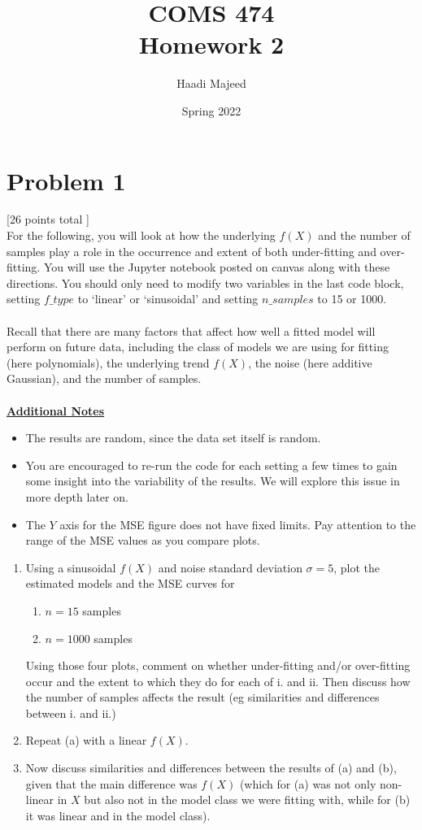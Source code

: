 \documentclass[12pt]{article}
\title{ COMS 474\\Homework 2 }
\author{ Haadi Majeed }
\date{Spring 2022}
\begin{document}
\maketitle
\pagebreak

\section*{Problem 1}
 [26 points total ]\\
For the following, you will look at how the underlying $f(X)$ and the number of samples play a role in the occurrence and extent of both under-fitting and over-fitting. You will use the Jupyter notebook posted on canvas along with these directions. You should only need to modify two variables in the last code block, setting $f\_type$ to ‘linear’ or ‘sinusoidal’ and setting $n\_samples$ to 15 or 1000.
\\\\
Recall that there are many factors that affect how well a fitted model will perform on future data, including the class of models we are using for fitting (here polynomials), the underlying trend $f(X)$, the noise (here additive Gaussian), and the number of samples.
\\\\
\textbf{\underline{Additional Notes}}
\begin{itemize}
    \item The results are random, since the data set itself is random.
    \item You are encouraged to re-run the code for each setting a few times to gain some insight into the variability of the results. We will explore this issue in more depth later on.
    \item The $Y$ axis for the MSE figure does not have fixed limits. Pay attention to the range of the MSE values as you compare plots.
\end{itemize}

\begin{enumerate}[label=(\alph*)]
    \item Using a sinusoidal $f(X)$ and noise standard deviation $\sigma = 5$, plot the estimated models and the MSE curves for
          \begin{enumerate}[label=(\roman*)]
              \item $n = 15$ samples
              \item $ n = 1000$ samples
          \end{enumerate}
          Using those four plots, comment on whether under-fitting and/or over-fitting occur and the extent to which they do for each of i. and ii. Then discuss how the number of samples affects the result (eg similarities and differences between i. and ii.)
    \item Repeat (a) with a linear $f(X)$.
    \item Now discuss similarities and differences between the results of (a) and (b), given that the main difference was $f(X)$ (which for (a) was not only non-linear in $X$ but also not in the model class we were fitting with, while for (b) it was linear and in the model class).
\end{enumerate}
\end{document}
